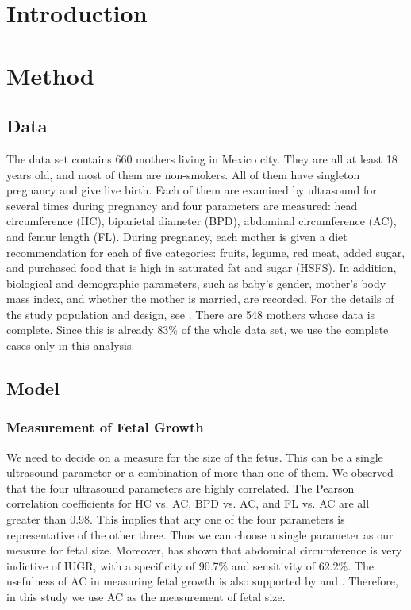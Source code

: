 \documentclass[12pt]{article}
\begin{document}
\section{Introduction}

\section{Method}

\subsection{Data}

The data set contains 660 mothers living in Mexico city.
They are all at least 18 years old,
and most of them are non-smokers.
All of them have singleton pregnancy and give live birth.
Each of them are examined by ultrasound for several times during pregnancy
and four parameters are measured:
head circumference (HC),
biparietal diameter (BPD),
abdominal circumference (AC),
and femur length (FL).
During pregnancy,
each mother is given a diet recommendation for each of five categories:
fruits,
legume,
red meat,
added sugar,
and purchased food that is high in saturated fat and sugar (HSFS).
In addition, biological and demographic parameters,
such as
baby's gender,
mother's body mass index,
and whether the mother is married,
are recorded.
For the details of the study population and design,
see \citet{o2013air}.
There are 548 mothers whose data is complete.
Since this is already 83\% of the whole data set,
we use the complete cases only in this analysis.

\subsection{Model}

\subsubsection{Measurement of Fetal Growth}

We need to decide on a measure for the size of the fetus.
This can be a single ultrasound parameter or a combination of more than one of them.
We observed that the four ultrasound parameters are highly correlated.
The Pearson correlation coefficients for HC vs. AC, BPD vs. AC, and FL vs. AC are all greater than 0.98.
This implies that any one of the four parameters is representative of the other three.
Thus we can choose a single parameter as our measure for fetal size.
Moreover, \citet{ott2002diagnosis} has shown that abdominal circumference is
very indictive of IUGR,
with a specificity of 90.7\% and sensitivity of 62.2\%.
The usefulness of AC in measuring fetal growth is also supported by
\citet{williams2001abdominal} and \cite{resnik2002intrauterine}.
Therefore, in this study we use AC as the measurement of fetal size.
\end{document}
